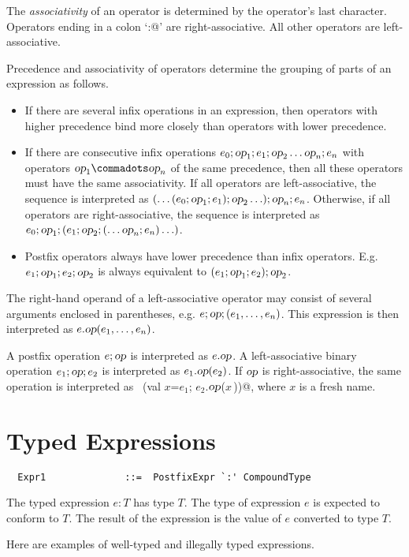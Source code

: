 The {\em associativity} of an operator is determined by the operator's
last character.  Operators ending in a colon `\lstinline@:@' are
right-associative. All other operators are left-associative.

Precedence and associativity of operators determine the grouping of
parts of an expression as follows.
\begin{itemize}
\item If there are several infix operations in an
expression, then operators with higher precedence bind more closely
than operators with lower precedence.
\item If there are consecutive infix
operations $e_0; \mbox{\sl op}_1; e_1; \mbox{\sl op}_2 \ldots \mbox{\sl op}_n; e_n$ 
with operators $\op_1 \commadots \op_n$ of the same precedence, 
then all these operators must
have the same associativity. If all operators are left-associative,
the sequence is interpreted as
$(\ldots(e_0;\mbox{\sl op}_1;e_1);\mbox{\sl op}_2\ldots);\mbox{\sl op}_n;e_n$. 
Otherwise, if all operators are right-associative, the
sequence is interpreted as
$e_0;\mbox{\sl op}_1;(e_1;\mbox{\sl op}_2;(\ldots \mbox{\sl op}_n;e_n)\ldots)$.
\item
Postfix operators always have lower precedence than infix
operators. E.g.\ $e_1;\mbox{\sl op}_1;e_2;\mbox{\sl op}_2$ is always equivalent to
$(e_1;\mbox{\sl op}_1;e_2);\mbox{\sl op}_2$.
\end{itemize}
The right-hand operand of a left-associative operator may consist of
several arguments enclosed in parentheses, e.g. $e;\mbox{\sl op};(e_1,\ldots,e_n)$.
This expression is then interpreted as $e.\mbox{\sl op}(e_1,\ldots,e_n)$.

A postfix operation $e;\mbox{\sl op}$ is interpreted as $e.\mbox{\sl op}$. A
left-associative binary operation $e_1;\mbox{\sl op};e_2$ is interpreted as
$e_1.\mbox{\sl op}(e_2)$. If $\mbox{\sl op}$ is right-associative, the same operation is
interpreted as ~\lstinline@(val $x$=$e_1$; $e_2$.$\mbox{\sl op}$($x\,$))@, 
where $x$ is a fresh name.

\section{Typed Expressions}

\syntax\begin{lstlisting}
  Expr1              ::=  PostfixExpr `:' CompoundType
\end{lstlisting}

The typed expression $e: T$ has type $T$. The type of
expression $e$ is expected to conform to $T$. The result of
the expression is the value of $e$ converted to type $T$.

\example Here are examples of well-typed and illegally typed expressions.

